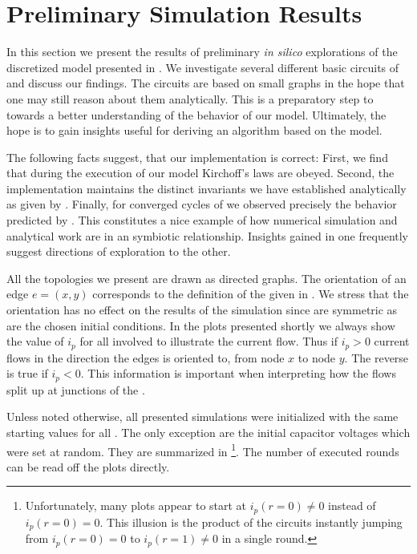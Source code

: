 
\section{Preliminary Simulation Results}

	In this section we present the results of preliminary \emph{in silico} explorations of the discretized model presented in . We investigate several different basic circuits of \Pes and discuss our findings. The circuits are based on small graphs in the hope that one may still reason about them analytically. This is a preparatory step to towards a better understanding of the behavior of our model. Ultimately, the hope is to gain insights useful for deriving an algorithm based on the model.

	The following facts suggest, that our implementation is correct: First, we find that during the execution of our model Kirchoff's laws are obeyed. Second, the implementation maintains the distinct invariants we have established analytically as given by . Finally, for converged cycles of \Pes we observed precisely the behavior predicted by . This constitutes a nice example of how numerical simulation and analytical work are in an symbiotic relationship. Insights gained in one frequently suggest directions of exploration to the other. 

	All the topologies we present are drawn as directed graphs. The orientation of an edge $e = (x,y)$ corresponds to the definition of the \Pe given in . We stress that the orientation has no effect on the results of the simulation since \Pes are symmetric as are the chosen initial conditions. In the plots presented shortly we always show the value of $i_p$ for all involved \Pes to illustrate the current flow. Thus if $i_p > 0$ current flows in the direction the edges is oriented to, \ie from node $x$ to node $y$. The reverse is true if $i_p <0$. This information is important when interpreting how the flows split up at junctions of the \Pn.

	Unless noted otherwise, all presented simulations were initialized with the same starting values for all \Pes. The only exception are the initial capacitor voltages which were set at random. They are summarized in \footnote{Unfortunately, many plots appear to start at $i_p(r=0) \neq 0$ instead of $i_p(r=0) = 0$. This illusion is the product of the circuits instantly jumping from $i_p(r=0) = 0$ to $i_p(r=1) \neq 0$ in a single round.}. The number of executed rounds can be read off the plots directly. 

